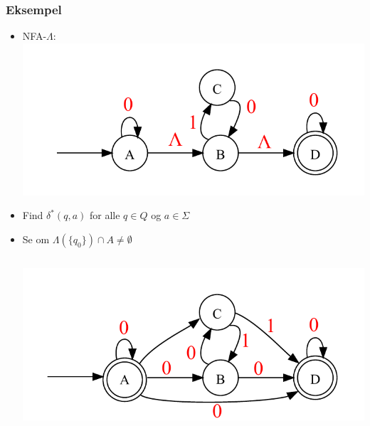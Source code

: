 \begin{frame}
\frametitle{Eksempel}
\begin{itemize}[<+->]
\item NFA-$\Lambda$:
  \includegraphics[scale=0.4]{images/2_seminar_lambdaelim}
\item Find $\delta^*(q,a)$ for alle $q\in Q$ og $a\in \Sigma$
\item Se om $\Lambda(\{q_0\})\cap A \neq \emptyset$
\begin{columns}
\column{5cm}
\column{5cm}
\includegraphics[scale=0.4]{images/2_seminar_lambdaelim2}
\end{columns}
\end{itemize}
\end{frame}
